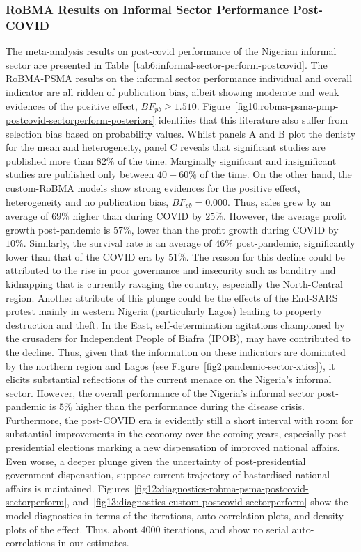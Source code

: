 \documentclass[a4paper, 12pt]{article}
\begin{document}
    \subsubsection{RoBMA Results on Informal Sector Performance Post-COVID}\label{subsubsec:robma-results-on-informal-sector-performance-post-covid}
    The meta-analysis results on post-covid performance of the Nigerian informal sector are presented in Table~\ref{tab6:informal-sector-perform-postcovid}. The RoBMA-PSMA results on the informal sector performance individual and overall indicator are all ridden of publication bias, albeit showing moderate and weak evidences of the positive effect, $BF_{pb} \geq 1.510$. Figure~\ref{fig10:robma-psma-pmp-postcovid-sectorperform-posteriors} identifies that this literature also suffer from selection bias based on probability values. Whilst panels A and B plot the denisty for the mean and heterogeneity, panel C reveals that significant studies are published more than $82\%$ of the time. Marginally significant and insignificant studies are published only between $40-60\%$ of the time. On the other hand, the custom-RoBMA models show strong evidences for the positive effect, heterogeneity and no publication bias, $BF_{pb} = 0.000$. Thus, sales grew by an average of $69\%$ higher than during COVID by $25\%$. However, the average profit growth post-pandemic is $57\%$, lower than the profit growth during COVID by $10\%$. Similarly, the survival rate is an average of $46\%$ post-pandemic, significantly lower than that of the COVID era by $51\%$. The reason for this decline could be attributed to the rise in poor governance and insecurity such as banditry and kidnapping that is currently ravaging the country, especially the North-Central region. Another attribute of this plunge could be the effects of the End-SARS protest mainly in western Nigeria (particularly Lagos) leading to property destruction and theft. In the East, self-determination agitations championed by the crusaders for Independent People of Biafra (IPOB), may have contributed to the decline. Thus, given that the information on these indicators are dominated by the northern region and Lagos (see Figure~\ref{fig2:pandemic-sector-xtics}), it elicits substantial reflections of the current menace on the Nigeria's informal sector. However, the overall performance of the Nigeria's informal sector post-pandemic is $5\%$ higher than the performance during the disease crisis. Furthermore, the post-COVID era is evidently still a short interval with room for substantial improvements in the economy over the coming years, especially post-presidential elections marking a new dispensation of improved national affairs. Even worse, a deeper plunge given the uncertainty of post-presidential government dispensation, suppose current trajectory of bastardised national affairs is maintained. Figures~\ref{fig12:diagnostics-robma-psma-postcovid-sectorperform}, and~\ref{fig13:diagnostics-custom-postcovid-sectorperform} show the model diagnostics in terms of the iterations, auto-correlation plots, and density plots of the effect. Thus, about $4000$ iterations, and show no serial auto-correlations in our estimates.
\end{document}

